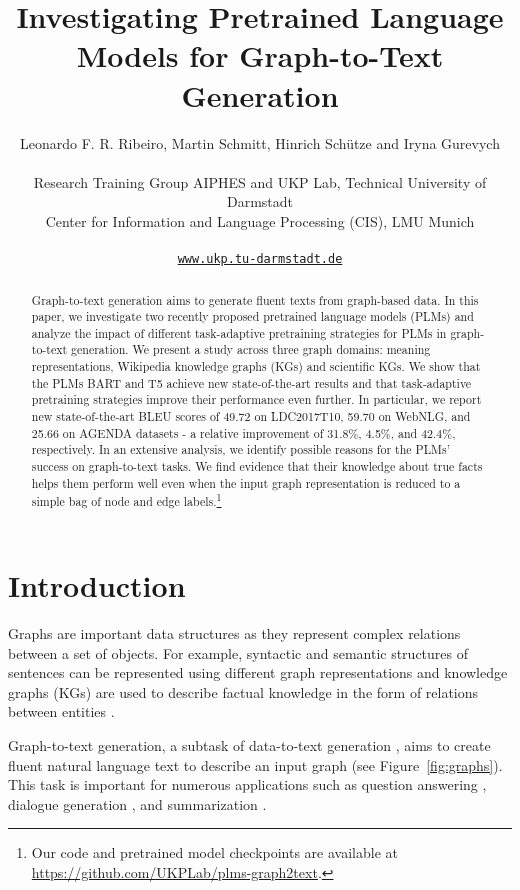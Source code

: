 \documentclass[11pt,a4paper]{article}
\title{Investigating Pretrained Language Models for Graph-to-Text Generation}
\author{Leonardo F. R. Ribeiro, Martin Schmitt, Hinrich Sch{\"u}tze and Iryna Gurevych \vspace{1mm} \\
\rule{0pt}{2.5ex}
  Research Training Group AIPHES and UKP Lab, Technical University of Darmstadt\\
  Center for Information and Language Processing (CIS), LMU Munich \\
  \rule{0pt}{2.5ex}
 \texttt{\href{https://www.ukp.tu-darmstadt.de}{www.ukp.tu-darmstadt.de}}
}
\date{}
\begin{document}
\maketitle
\begin{abstract}
Graph-to-text generation aims to generate fluent texts from graph-based data. In this paper, we investigate two recently proposed pretrained language models (PLMs) and analyze the impact of different task-adaptive pretraining strategies for PLMs in graph-to-text generation. We present a study across three graph domains: meaning representations, Wikipedia knowledge graphs (KGs) and scientific KGs. We show that the PLMs BART and T5 achieve new state-of-the-art results and that task-adaptive pretraining strategies improve their performance even further. In particular, we report new state-of-the-art BLEU scores of 49.72 on LDC2017T10, 59.70 on WebNLG, and 25.66 on AGENDA datasets - a relative improvement of 31.8\%, 4.5\%, and 42.4\%, respectively. In an extensive analysis, we identify possible reasons for the PLMs’ success on graph-to-text tasks. We find evidence that their knowledge about true facts helps them perform well even when the input graph representation is reduced to a simple bag of node and edge labels.\footnote{Our code and pretrained model checkpoints are available at \href{https://github.com/UKPLab/plms-graph2text}{https://github.com/UKPLab/plms-graph2text}.}
\end{abstract}



\section{Introduction}

Graphs are important data structures as they represent complex relations between a set of objects. For example, syntactic and semantic structures of sentences can be represented using different graph representations \cite{bastings-etal-2017-graph, banarescu-etal-2013-abstract} and knowledge graphs (KGs) are used to describe factual knowledge in the form of relations between entities \cite{gardent-etal-2017-webnlg}.

Graph-to-text generation, a subtask of data-to-text generation \cite{10.5555/3241691.3241693}, aims to create fluent natural language text to describe an input graph (see Figure~\ref{fig:graphs}). This task is important for numerous applications such as question answering \cite{duan-etal-2017-question}, dialogue generation \cite{moon-etal-2019-opendialkg}, and summarization \cite{fan-etal-2019-using}.
\end{document}
